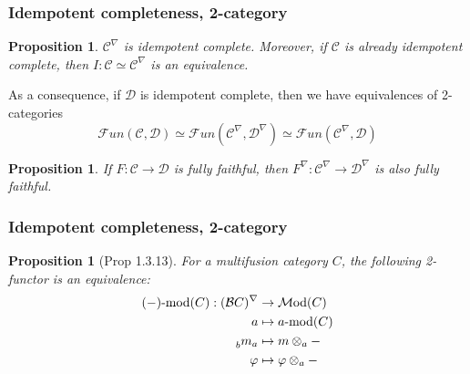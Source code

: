 \documentclass{beamer}
\newcommand{\tnsr}{\otimes}
\newcommand{\vphi}{\varphi}
\newtheorem{proposition}[theorem]{Proposition}
\newcommand{\cB}{{\mathcal{B}}}
\newcommand{\cC}{{\mathcal{C}}}
\newcommand{\cD}{{\mathcal{D}}}
\newcommand{\cFun}{{\mathcal{F}un}}
\newcommand{\amod}[1]{{#1\textrm{-mod}}}
\newcommand{\Mod}{{\mathcal{M}\textrm{od}}}
\newcommand{\ModA}[1]{{\Mod(#1)}}
\begin{document}
\begin{frame}
\frametitle{Idempotent completeness, 2-category}

\begin{proposition}
$\cC^\nabla$ is idempotent complete.
Moreover, if $\cC$ is already idempotent complete,
then $I: \cC \simeq \cC^\nabla$ is an equivalence.
\end{proposition}

\pause

As a consequence, if $\cD$ is idempotent complete,
then we have equivalences of 2-categories
\[
\cFun(\cC,\cD) \simeq \cFun(\cC^\nabla,\cD^\nabla)
\simeq \cFun(\cC^\nabla, \cD)
\]

\pause

\begin{proposition}
If $F: \cC \to \cD$ is fully faithful,
then $F^\nabla: \cC^\nabla \to \cD^\nabla$
is also fully faithful.
\end{proposition}

\end{frame}

\begin{frame}
\frametitle{Idempotent completeness, 2-category}


\begin{proposition}[\cite{DRfusion}{Prop 1.3.13}]
\label{p:modC-deloop}
For a multifusion category $C$,
the following 2-functor is an equivalence:
\begin{align*}
\amod{(-)}(C): (\cB C)^\nabla
	& \to
	\ModA{C}
\\
a & \mapsto
	\amod{a}(C)
\\
\prescript{}{b}m_a & \mapsto
	m \tnsr_a -
\\
\vphi & \mapsto
\vphi \tnsr_a -
\end{align*}
\end{proposition}

\end{frame}
\end{document}
